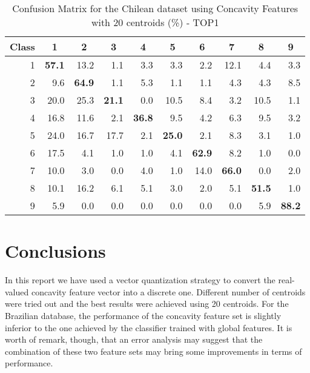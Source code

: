 \documentclass{article}[14pt, oneside, a4paper, times]
\begin{document}
\begin{table} [ht!]
\caption {Confusion Matrix for the Chilean dataset using Concavity Features with 20 centroids (\%) - TOP1}
\begin{center}
\begin{tabular}{rrrrrrrrrr} \hline 
 \multicolumn{1}{c}{Class}&
 \multicolumn{1}{c}{1}&
 \multicolumn{1}{c}{2}&
 \multicolumn{1}{c}{3}&
 \multicolumn{1}{c}{4}&
 \multicolumn{1}{c}{5}&
 \multicolumn{1}{c}{6}&
 \multicolumn{1}{c}{7}&
 \multicolumn{1}{c}{8}&
 \multicolumn{1}{c}{9} \\ \hline


1 & \textbf{57.1}&	13.2		&	1.1	&	3.3	&	3.3	&	2.2	&	12.1	&	4.4	&	3.3 \\2 & 9.6			&	\textbf{64.9}&	1.1	&	5.3	&	1.1	&	1.1	&	4.3	&	4.3	&	8.5 \\3 & 20.0		&	25.3		&	\textbf{21.1}	&	0.0	&	10.5	&	8.4	&	3.2	&	10.5	&	1.1\\4 & 16.8		&	11.6		&	2.1	&	\textbf{36.8}	&	9.5	&	4.2	&	6.3	&	9.5	&	3.2\\5 & 24.0		&	16.7		&	17.7	&	2.1	&	\textbf{25.0}	&	2.1	&	8.3	&	3.1	&	1.0\\6 & 17.5		&	4.1			&	1.0	&	1.0	&	4.1	&	\textbf{62.9}	&	8.2	&	1.0	&	0.0\\7 & 10.0		&	3.0			&	0.0	&	4.0	&	1.0	&	14.0	&	\textbf{66.0}	&	0.0	&	2.0\\8 & 10.1		&	16.2		&	6.1	&	5.1	&	3.0	&	2.0	&	5.1	&	\textbf{51.5}	&	1.0\\9 & 5.9			&	0.0			&	0.0	&	0.0	&	0.0	&	0.0	&	0.0	&	5.9	&	\textbf{88.2}\\ \hline

\end{tabular}
\label{top1:tab}
\end{center}
\end{table}


\section{Conclusions}

In this report we have used a vector quantization strategy to convert the real-valued concavity feature vector into a discrete one. Different number of centroids were tried out and the best results were achieved using 20 centroids. For the Brazilian database, the performance of the concavity feature set is slightly inferior to the one achieved by the classifier trained with global features. It is worth of remark, though, that an error analysis may suggest that the combination of these two feature sets may bring some improvements in terms of performance.  
\end{document}
